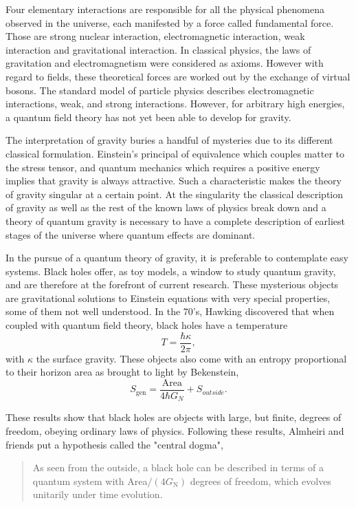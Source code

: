 Four elementary interactions are responsible for all the physical phenomena observed in the universe, each manifested by a force called fundamental force. Those are strong nuclear interaction, electromagnetic interaction, weak interaction and gravitational interaction. In classical physics, the laws of gravitation and electromagnetism were considered as axioms. However with regard to fields, these theoretical forces are worked out by the exchange of virtual bosons. The standard model of particle physics describes electromagnetic interactions, weak\cite{osti_4767615,PhysRevLett.19.1264}, and strong interactions. However, for arbitrary high energies, a quantum field theory has not yet been able to develop for gravity. 

The interpretation of gravity buries a handful of mysteries due to its different classical formulation. Einstein's principal of equivalence which couples matter to the stress tensor, and quantum mechanics which requires a positive energy implies that gravity is always attractive. Such a characteristic makes the theory of gravity singular at a certain point\cite{PhysRevD.14.2460}. At the singularity the classical description of gravity as well as the rest of the known laws of physics break down and a theory of quantum gravity is necessary to have a complete description of earliest stages of the universe where quantum effects are dominant.

In the pursue of a quantum theory of gravity, it is preferable to contemplate easy systems. Black holes offer, as toy models, a window to study quantum gravity, and are therefore at the forefront of current research. These mysterious objects are gravitational solutions to Einstein equations\cite{Schwarzschild:1916uq} with very special properties, some of them not well understood. In the 70's, Hawking discovered \cite{Hawking1975} that when coupled with quantum field theory, black holes have a temperature
\begin{equation}\label{Hawking temperature}
    T = \frac{\hbar \kappa}{2\pi},
\end{equation}
with $\kappa$ the surface gravity. These objects also come with an entropy proportional to their horizon area as brought to light by Bekenstein\cite{Bekenstein1972},
\begin{equation}\label{beken}
    S_{\text{gen}} = \frac{\text{Area}}{4\hbar G_N} + S_{outside}.
\end{equation}

These results show that black holes are objects with large, but finite, degrees of freedom, obeying ordinary laws of physics. Following these results, Almheiri and friends \cite{almheiri2020entropy} put a hypothesis called the "central dogma",
\begin{quote}
    As seen from the outside, a black hole can be described in terms of a quantum system with Area$/\left(4G_\text{N}\right)$ degrees of freedom, which evolves unitarily under time evolution.
\end{quote}

